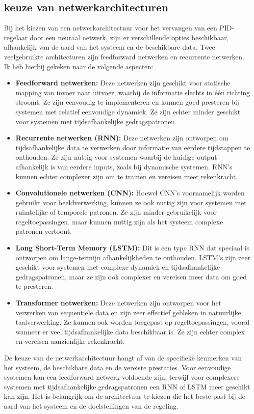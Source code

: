 \subsection{keuze van netwerkarchitecturen }
Bij het kiezen van een netwerkarchitectuur voor het vervangen van een PID-regelaar door een neuraal netwerk, zijn er verschillende opties beschikbaar, afhankelijk van de aard van het systeem en de beschikbare data. Twee veelgebruikte architecturen zijn feedforward netwerken en recurrente netwerken. Ik heb hierbij gekeken naar de volgende aspecten:
\begin{itemize}
  \item \textbf{Feedforward netwerken:} Deze netwerken zijn geschikt voor statische mapping van invoer naar uitvoer, waarbij de informatie slechts in één richting stroomt. Ze zijn eenvoudig te implementeren en kunnen goed presteren bij systemen met relatief eenvoudige dynamiek. Ze zijn echter minder geschikt voor systemen met tijdsafhankelijke gedragspatronen.      
  \item \textbf{Recurrente netwerken (RNN):} Deze netwerken zijn ontworpen om tijdsafhankelijke data te verwerken door informatie van eerdere tijdstappen te onthouden. Ze zijn nuttig voor systemen waarbij de huidige output afhankelijk is van eerdere inputs, zoals bij dynamische systemen. RNN's kunnen echter complexer zijn om te trainen en vereisen meer rekenkracht.
  \item   \textbf{Convolutionele netwerken (CNN):} Hoewel CNN's voornamelijk worden gebruikt voor beeldverwerking, kunnen ze ook nuttig zijn voor systemen met ruimtelijke of temporele patronen. Ze zijn minder gebruikelijk voor regeltoepassingen, maar kunnen nuttig zijn als het systeem complexe patronen vertoont.
  \item \textbf{Long Short-Term Memory (LSTM):} Dit is een type RNN dat speciaal is ontworpen om lange-termijn afhankelijkheden te onthouden. LSTM's zijn zeer geschikt voor systemen met complexe dynamiek en tijdsafhankelijke gedragspatronen, maar ze zijn ook complexer en vereisen meer data om goed te presteren.
  \item   \textbf{Transformer netwerken:} Deze netwerken zijn ontworpen voor het verwerken van sequentiële data en zijn zeer effectief gebleken in natuurlijke taalverwerking. Ze kunnen ook worden toegepast op regeltoepassingen, vooral wanneer er veel tijdsafhankelijke data beschikbaar is. Ze zijn echter complex en vereisen aanzienlijke rekenkracht.
\end{itemize}
De keuze van de netwerkarchitectuur hangt af van de specifieke kenmerken van het systeem, de beschikbare data en de vereiste prestaties. Voor eenvoudige systemen kan een feedforward netwerk voldoende zijn, terwijl voor complexere systemen met tijdsafhankelijke gedragspatronen een RNN of LSTM meer geschikt kan zijn. Het is belangrijk om de architectuur te kiezen die het beste past bij de aard van het systeem en de doelstellingen van de regeling.
